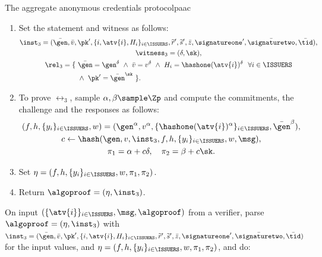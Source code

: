 \begin{protocolbox}{The aggregate anonymous credentials protocol}{paac}
\begin{description}
\begin{enumerate}
	\item Set the statement and witness as follows:
	  \begin{equation*}\begin{gathered}
	    \inst_3 = (\bar{\gen}, \bar{v}, \pk', \{i, \atv{i}, H_i\}_{i\in\ISSUERS},
\widetilde{r}', \widetilde{s}', \bar{z}, \signatureone', \bar{\signaturetwo},
\bar{\tid}), \\ \witness_3 = (\delta, \sk), \\
	    \rel_3 = \{\ \begin{aligned}[t] &\bar{\gen} = \gen^\delta \ \wedge\ \bar{v} = v^\delta \
\wedge\ H_i = \hashone(\atv{i})^\delta\ \ \forall i \in \ISSUERS \\ &\wedge\ \pk'
= \bar{\gen}^\sk\ \}.\end{aligned}
	\end{gathered}\end{equation*}

      \item To prove $\rel_3$, sample $\alpha, \beta \sample \Zp$ and compute
the commitments, the challenge and the responses as follows:
	  \begin{gather*}
	    (f, h, \{y_i\}_{i \in \ISSUERS}, w) = (\gen^\alpha, v^\alpha,
\{\hashone(\atv{i})^\alpha\}_{i \in \ISSUERS}, \bar{\gen}^\beta), \\
	    c \leftarrow \hash(\gen, v, \inst_3, f, h, \{y_i\}_{i \in
\ISSUERS}, w, \msg), \\
	    \pi_1 = \alpha + c\delta, \quad \pi_2 = \beta + c\sk.
	  \end{gather*}

      \item Set $\eta = (f, h, \{y_i\}_{i \in \ISSUERS}, w, \pi_1, \pi_2)$.

      \item Return $\algoproof = (\eta, \inst_3)$.

    \end{enumerate}

  \item[$\{0,1\} \leftarrow \AACverify(\crs,\{\atv{i}\}_{i \in
\ISSUERS},\msg,\algoproof)$ :] On input $(\{\atv{i}\}_{i \in
\ISSUERS},\msg,\algoproof)$ from a verifier, parse $\algoproof = (\eta,
\inst_3)$ with $\inst_3 = (\bar{\gen}, \bar{v}, \pk', \{i, \atv{i},
H_i\}_{i\in\ISSUERS}, \widetilde{r}', \widetilde{s}', \bar{z},
\signatureone', \bar{\signaturetwo}, \bar{\tid})$ for the input values, and $\eta = (f, h, \{y_i\}_{i \in \ISSUERS}, w, \pi_1, \pi_2)$, and do:


\end{description}
\end{protocolbox}

